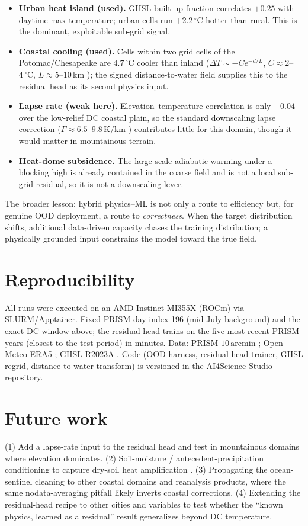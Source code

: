 \documentclass[11pt]{article}
\begin{document}
\begin{itemize}[nosep]
\item \textbf{Urban heat island (used).} GHSL built-up fraction correlates
$+0.25$ with daytime max temperature; urban cells run $+2.2\,^\circ\mathrm{C}$
hotter than rural. This is the dominant, exploitable sub-grid signal.
\item \textbf{Coastal cooling (used).} Cells within two grid cells of the
Potomac/Chesapeake are $4.7\,^\circ\mathrm{C}$ cooler than inland
($\Delta T \sim -C e^{-d/L}$, $C\!\approx\!2$--$4\,^\circ\mathrm{C}$,
$L\!\approx\!5$--$10\,\mathrm{km}$ \cite{seabreeze}); the signed distance-to-water
field supplies this to the residual head as its second physics input.
\item \textbf{Lapse rate (weak here).} Elevation--temperature correlation is only
$-0.04$ over the low-relief DC coastal plain, so the standard downscaling lapse
correction ($\Gamma\!\approx\!6.5$--$9.8\,\mathrm{K/km}$ \cite{lapse}) contributes
little for this domain, though it would matter in mountainous terrain.
\item \textbf{Heat-dome subsidence.} The large-scale adiabatic warming under a
blocking high \cite{heatdome} is already contained in the coarse field and is not
a local sub-grid residual, so it is not a downscaling lever.
\end{itemize}

The broader lesson: hybrid physics--ML \cite{neuralgcm} is not only a route to
efficiency but, for genuine OOD deployment, a route to \emph{correctness}. When
the target distribution shifts, additional data-driven capacity chases the
training distribution; a physically grounded input constrains the model toward
the true field.

\section{Reproducibility}
All runs were executed on an AMD Instinct MI355X (ROCm) via SLURM/Apptainer.
Fixed PRISM day index 196 (mid-July background) and the exact DC window above; the
residual head trains on the five most recent PRISM years (closest to the test
period) in minutes. Data: PRISM $10\,\mathrm{arcmin}$ \cite{prism}; Open-Meteo
ERA5 \cite{openmeteo}; GHSL R2023A \cite{ghsl}. Code (OOD harness, residual-head
trainer, GHSL regrid, distance-to-water transform) is versioned in the AI4Science
Studio repository.

\section*{Future work}
(1) Add a lapse-rate input to the residual head and test in mountainous domains
where elevation dominates. (2) Soil-moisture / antecedent-precipitation
conditioning to capture dry-soil heat amplification \cite{soilmoisture}. (3)
Propagating the ocean-sentinel cleaning to other coastal domains and reanalysis
products, where the same nodata-averaging pitfall likely inverts coastal
corrections. (4) Extending the residual-head recipe to other cities and variables
to test whether the ``known physics, learned as a residual'' result generalizes
beyond DC temperature.
\end{document}
